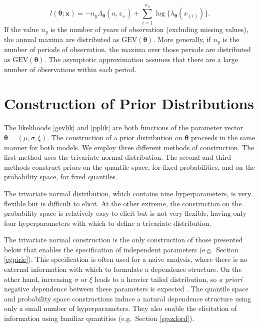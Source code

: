 \documentclass[11pt,a4paper]{article}
\newcommand{\bs}{\boldsymbol}
\begin{document}
\begin{equation}
l(\bs{\theta} ; \bs{x}) = -n_y\Lambda_{\bs{\theta}}(u,z_+) + \sum_{i=1}^{n_u} \log\{\lambda_{\bs{\theta}}(x_{(i)})\}.
\label{pplik}
\end{equation}
If the value $n_y$ is the number of years of observation (excluding missing values), the annual maxima are distributed as $\text{GEV}(\bs{\theta})$.
More generally, if $n_y$ is the number of periods of observation, the maxima over those periods are distributed as $\text{GEV}(\bs{\theta})$.
The asymptotic approximation assumes that there are a large number of observations within each period.



\section{Construction of Prior Distributions}
\setcounter{footnote}{0}
\label{prior}

The likelihoods \eqref{gevlik} and \eqref{pplik} are both functions of the parameter vector $\bs{\theta} = (\mu,\sigma,\xi)$.
The construction of a prior distribution on $\bs{\theta}$ proceeds in the same manner for both models. 
We employ three different methods of construction.
The first method uses the trivariate normal distribution.
The second and third methods construct priors on the quantile space, for fixed probabilities, and on the probability space, for fixed quantiles.

The trivariate normal distribution, which contains nine hyperparameters, is very flexible but is difficult to elicit.
At the other extreme, the construction on the probability space is relatively easy to elicit but is not very flexible, having only four hyperparameters with which to define a trivariate distribution.

The trivariate normal construction is the only construction of those presented below that enables the specification of independent parameters (e.g.\ Section \ref{egpirie}).
This specification is often used for a naive analysis, where there is no external information with which to formulate a dependence structure.
On the other hand, increasing $\sigma$ or $\xi$ leads to a heavier tailed distribution, so \emph{a priori} negative dependence between these parameters is expected \citep{coletawn96}.
The quantile space and probability space constructions induce a natural dependence structure using only a small number of hyperparameters.
They also enable the elicitation of information using familiar quantities (e.g.\ Section \ref{egoxford}).
  
\end{document}
